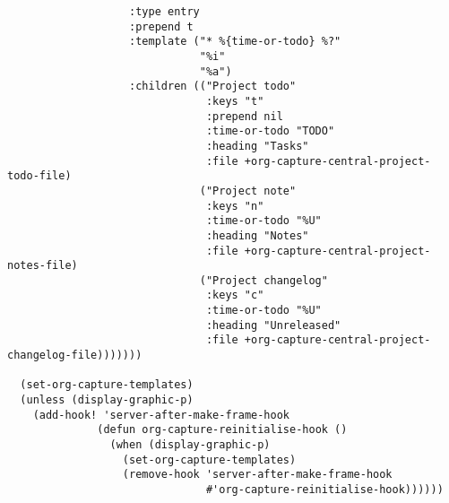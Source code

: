 \documentclass[c]{article}
\theoremstyle{plain}%
\theoremstyle{definition}
\theoremstyle{remark}
\begin{document}
\begin{verbatim}
                   :type entry
                   :prepend t
                   :template ("* %{time-or-todo} %?"
                              "%i"
                              "%a")
                   :children (("Project todo"
                               :keys "t"
                               :prepend nil
                               :time-or-todo "TODO"
                               :heading "Tasks"
                               :file +org-capture-central-project-todo-file)
                              ("Project note"
                               :keys "n"
                               :time-or-todo "%U"
                               :heading "Notes"
                               :file +org-capture-central-project-notes-file)
                              ("Project changelog"
                               :keys "c"
                               :time-or-todo "%U"
                               :heading "Unreleased"
                               :file +org-capture-central-project-changelog-file)))))))

  (set-org-capture-templates)
  (unless (display-graphic-p)
    (add-hook! 'server-after-make-frame-hook
              (defun org-capture-reinitialise-hook ()
                (when (display-graphic-p)
                  (set-org-capture-templates)
                  (remove-hook 'server-after-make-frame-hook
                               #'org-capture-reinitialise-hook))))))
\end{verbatim}
\end{document}
